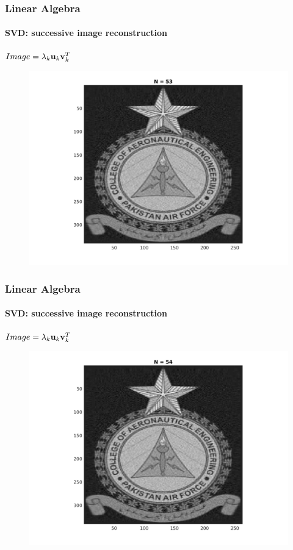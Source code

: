 \documentclass[hyperref={pdfpagelabels=true}]{beamer}
\begin{document}
\begin{frame}
\frametitle{Linear Algebra}
\framesubtitle{SVD: successive image reconstruction} 
\small{
\begin{center}
$Image = \lambda_k{\bf u}_k {\bf v}_k^T$
\end{center}}
\begin{figure}[!htb]
\centering
\includegraphics [scale=0.48]{n/b53.png}
\end{figure}
\end{frame}

\begin{frame}
\frametitle{Linear Algebra}
\framesubtitle{SVD: successive image reconstruction} 
\small{
\begin{center}
$Image = \lambda_k{\bf u}_k {\bf v}_k^T$
\end{center}}
\begin{figure}[!htb]
\centering
\includegraphics [scale=0.48]{n/b54.png}
\end{figure}
\end{frame}
\end{document}
